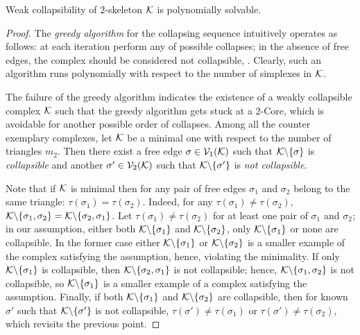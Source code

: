 \begin{theorem}\label{thm:poly}
      Weak collapsibility of \( 2\)-skeleton \( \mathcal{K} \) is polynomially solvable.
\end{theorem}
\begin{proof}
      The \emph{greedy algorithm} for the collapsing sequence intuitively operates as follows: at each iteration perform any of possible collapses; in the absence of free edges, the complex should be considered not collapsible, . Clearly, such an algorithm runs polynomially with respect to the number of simplexes in \(\mathcal{K}\).

      The failure of the greedy algorithm indicates the existence of a weakly collapsible complex \( \mathcal{K} \) such that the greedy algorithm gets stuck at a \( 2 \)-Core, which is avoidable for another possible order of collapses. Among all the counter exemplary complexes, let \( \mathcal{K} \) be a minimal one with respect to the number of triangles \( m_2 \). Then there exist a free edge \( \sigma \in \mathcal{V}_{1}(\mathcal{K}) \) such that \( \mathcal{K} \backslash \{ \sigma \} \) is \emph{collapsible} and another \( \sigma' \in \mathcal{V}_{2}(\mathcal{K}) \) such that \( \mathcal{K} \backslash \{ \sigma' \} \) is \emph{not collapsible}.

      Note that if \( \mathcal{K} \) is minimal then for any pair of free edges \( \sigma_1 \) and \( \sigma_2 \) belong to the same triangle: \( \tau(\sigma_1) = \tau(\sigma_2) \). Indeed, for any \( \tau(\sigma_1) \ne \tau(\sigma_2) \),  \( \mathcal{K} \backslash \{ \sigma_1, \sigma_2 \} = \mathcal{K} \backslash \{ \sigma_2, \sigma_1 \} \). Let \( \tau(\sigma_1) \ne \tau(\sigma_2) \) for at least one pair of \( \sigma_1 \) and \( \sigma_2 \); in our assumption, either both \( \mathcal{K} \backslash \{ \sigma_1 \} \) and \( \mathcal{K} \backslash \{ \sigma_2 \} \), only \( \mathcal{K} \backslash \{ \sigma_1 \}  \) or none are collapsible. In the former case either \( \mathcal{K} \backslash \{ \sigma_1 \} \) or \( \mathcal{K} \backslash \{ \sigma_2 \} \) is a smaller example of the complex satisfying the assumption, hence, violating the minimality. If only \( \mathcal{K} \backslash \{ \sigma_1 \} \) is collapsible, then \( \mathcal{K} \backslash \{ \sigma_2, \sigma_1 \}  \) is not collapsible; hence, \( \mathcal{K} \backslash \{ \sigma_1, \sigma_2 \} \) is not collapsible, so \( \mathcal{K} \backslash \{ \sigma_1 \} \) is a smaller example of a complex satisfying the assumption. Finally, if both \( \mathcal{K} \backslash \{ \sigma_1 \} \) and \( \mathcal{K} \backslash \{ \sigma_2 \} \) are collapsible, then for  known \( \sigma' \) such that \( \mathcal{K} \backslash \{ \sigma' \} \) is not collapsible, \( \tau(\sigma') \ne \tau(\sigma_1)\) or \( \tau(\sigma') \ne \tau(\sigma_2) \), which revisits the previous point.


\end{proof}
